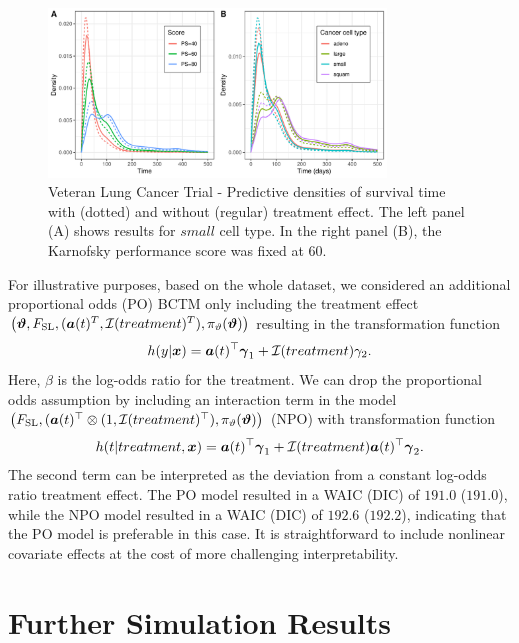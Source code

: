 \documentclass[12pt, a4paper]{article}
\begin{document}
\begin{figure}
\centering
   \hspace*{-1.5cm}\includegraphics[width=0.8\textwidth]{figs/vet_densities.pdf}\caption{\small Veteran Lung Cancer Trial - Predictive densities of survival time with (dotted) and without (regular) treatment effect. The left panel (A) shows results for $small$ cell type. In the right panel (B), the Karnofsky performance score was fixed at $60$.}\label{fig:VET1}
   \end{figure}
For illustrative purposes, based on the whole dataset, we considered an additional proportional odds (PO) BCTM only including the treatment effect $\big(\text{\boldmath$\vartheta$},F_\text{SL}, (\text{\boldmath$a$}(t)^T, \allowbreak\mathcal{I}(treatment)^T), \pi_{\vartheta}(\text{\boldmath$\vartheta$})\big)$ resulting in the transformation function
\begin{align*}
h(y|\text{\boldmath$x$}) = \text{\boldmath$a$}(t)^\top \text{\boldmath$\gamma$}_1  +\mathcal{I}(treatment)\gamma_2.
\end{align*}
 Here, $\beta$ is the log-odds ratio for the treatment. We can drop the proportional odds assumption by including an interaction term in the model $\big(F_{\text{SL}}, \allowbreak(\text{\boldmath$a$}(t)^\top \otimes (1, \allowbreak\mathcal{I}(treatment)^\top), \allowbreak\pi_{\vartheta}(\text{\boldmath$\vartheta$})\big)$ (NPO) with transformation function
\begin{align*}
h(t| treatment, \text{\boldmath$x$}) = \text{\boldmath$a$}(t)^\top \text{\boldmath$\gamma$}_1 +\mathcal{I}(treatment)\text{\boldmath$a$}(t)^\top\text{\boldmath$\gamma$}_2.
\end{align*}
The second term can be interpreted as the deviation from a constant log-odds ratio treatment effect.
The PO model resulted in a WAIC (DIC) of $191.0$ ($191.0$), while the NPO model resulted in a WAIC (DIC) of $192.6$ ($192.2$), indicating that the PO model is preferable in this case. It is straightforward to include nonlinear covariate effects at the cost of more challenging interpretability.
\FloatBarrier


\section{Further Simulation Results}\label{supp:sim}
\end{document}
